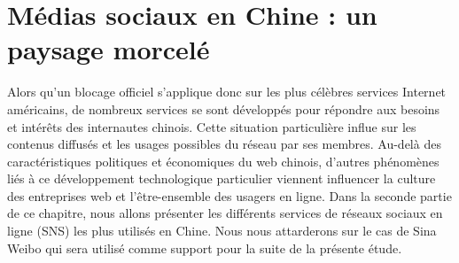 \section[Médias sociaux en Chine : un paysage morcelé]{Médias sociaux en Chine : un paysage morcelé}
Alors qu’un blocage officiel s’applique donc sur les plus célèbres services Internet américains, de nombreux services se sont développés pour répondre aux besoins et intérêts des internautes chinois. Cette situation particulière influe sur les contenus diffusés et les usages possibles du réseau par ses membres. Au-delà des caractéristiques politiques et économiques du web chinois, d’autres phénomènes liés à ce développement technologique particulier viennent influencer la culture des entreprises web et l’être-ensemble des usagers en ligne. Dans la seconde partie de ce chapitre, nous allons présenter les différents services de réseaux sociaux en ligne (SNS) les plus utilisés en Chine. Nous nous attarderons sur le cas de Sina Weibo qui sera utilisé comme support pour la suite de la présente étude. 

